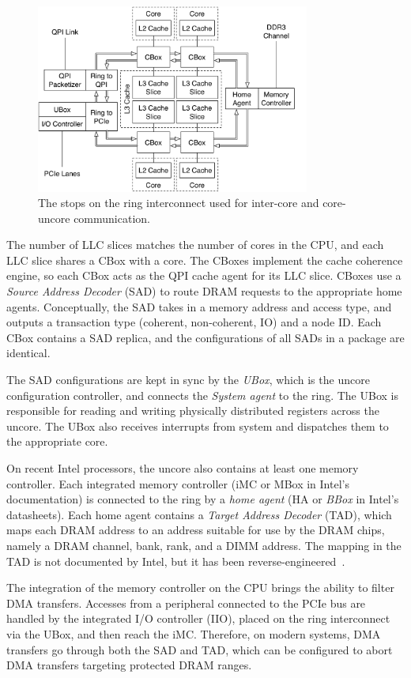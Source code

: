 \begin{figure}[hbt]
  \centering
  \includegraphics[width=90mm]{figures/cpu_uncore.pdf}
  \caption{
    The stops on the ring interconnect used for inter-core and core-uncore
    communication.
  }
  \label{fig:cpu_uncore}
\end{figure}

The number of LLC slices matches the number of cores in the CPU, and each LLC
slice shares a CBox with a core. The CBoxes implement the cache coherence
engine, so each CBox acts as the QPI cache agent for its LLC slice. CBoxes
use a \textit{Source Address Decoder} (SAD) to route DRAM requests to the
appropriate home agents. Conceptually, the SAD takes in a memory address and
access type, and outputs a transaction type (coherent, non-coherent, IO) and a
node ID. Each CBox contains a SAD replica, and the configurations of all SADs
in a package are identical.

The SAD configurations are kept in sync by the \textit{UBox}, which is the
uncore configuration controller, and connects the \textit{System agent} to the
ring. The UBox is responsible for reading and writing physically distributed
registers across the uncore. The UBox also receives interrupts from system and
dispatches them to the appropriate core.

On recent Intel processors, the uncore also contains at least one memory
controller. Each integrated memory controller (iMC or MBox in Intel's
documentation) is connected to the ring by a \textit{home agent} (HA or
\textit{BBox} in Intel's datasheets). Each home agent contains a
\textit{Target Address Decoder} (TAD), which maps each DRAM address to an
address suitable for use by the DRAM chips, namely a DRAM channel, bank, rank,
and a DIMM address. The mapping in the TAD is not documented by Intel, but it
has been reverse-engineered~\cite{pessil2015dramaddressing}.

The integration of the memory controller on the CPU brings the ability to
filter DMA transfers. Accesses from a peripheral connected to the PCIe bus are
handled by the integrated I/O controller (IIO), placed on the ring interconnect
via the UBox, and then reach the iMC. Therefore, on modern systems, DMA
transfers go through both the SAD and TAD, which can be configured to abort DMA
transfers targeting protected DRAM ranges.


